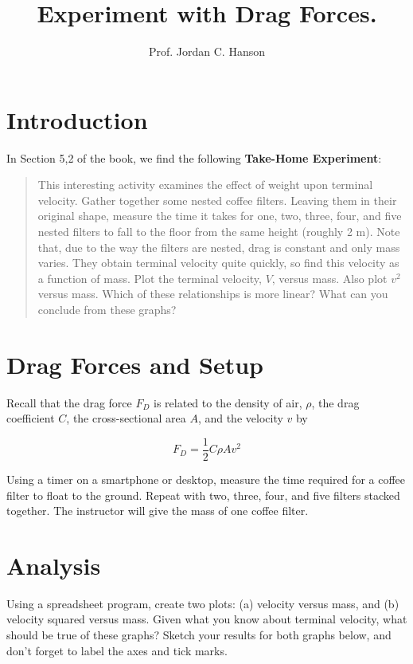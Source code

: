 \documentclass{article}
\begin{document}
\title{Experiment with Drag Forces.}
\author{Prof. Jordan C. Hanson}

\maketitle

\section{Introduction}

In Section 5,2 of the book, we find the following \textbf{Take-Home Experiment}:

\begin{quote}
This interesting activity examines the effect of weight upon terminal velocity. Gather together some nested coffee filters. Leaving them in their original shape, measure the time it takes for one, two, three, four, and five nested filters to fall to the floor from the same height (roughly 2 m).  Note that, due to the way the filters are nested, drag is constant and only mass varies. They obtain terminal velocity quite quickly, so find this velocity as a function of mass.  Plot the terminal velocity, $V$, versus mass. Also plot $v^2$ versus mass.  Which of these relationships is more linear? What can you conclude from these graphs?
\end{quote}

\section{Drag Forces and Setup}

Recall that the drag force $F_D$ is related to the density of air, $\rho$, the drag coefficient $C$, the cross-sectional area $A$, and the velocity $v$ by

\begin{equation}
F_D = \frac{1}{2}C\rho A v^2
\end{equation}

Using a timer on a smartphone or desktop, measure the time required for a coffee filter to float to the ground.  Repeat with two, three, four, and five filters stacked together.  The instructor will give the mass of one coffee filter.

\section{Analysis}

Using a spreadsheet program, create two plots: (a) velocity versus mass, and (b) velocity squared versus mass.  Given what you know about terminal velocity, what should be true of these graphs?  Sketch your results for both graphs below, and don't forget to label the axes and tick marks.
\end{document}
